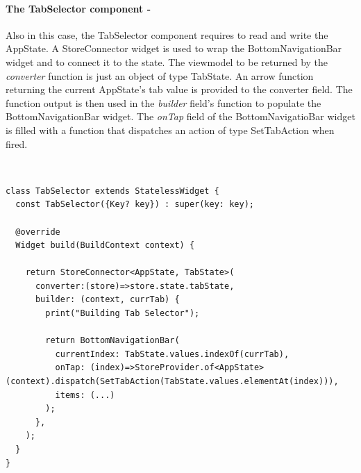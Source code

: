 \paragraph{The TabSelector component - }
\label{subpar:todo_app_bloc_core_state}
Also in this case, the TabSelector component requires to read and write the AppState. A StoreConnector widget is used to wrap the BottomNavigationBar widget and to connect it to the state. The viewmodel to be returned by the \textit{converter} function is just an object of type TabState. An arrow function returning the current AppState’s tab value is provided to the converter field. The function output is then used in the \textit{builder} field's function to populate the BottomNavigationBar widget. The \textit{onTap} field of the BottomNavigatioBar widget is filled with a function that dispatches an action of type SetTabAction when fired.
\begin{code}
\mbox{}\\
 \mbox{}
		\label{code:2.14}
\begin{verbatim}
class TabSelector extends StatelessWidget {
  const TabSelector({Key? key}) : super(key: key);

  @override
  Widget build(BuildContext context) {

    return StoreConnector<AppState, TabState>(
      converter:(store)=>store.state.tabState,
      builder: (context, currTab) {
        print("Building Tab Selector");

        return BottomNavigationBar(
          currentIndex: TabState.values.indexOf(currTab),
          onTap: (index)=>StoreProvider.of<AppState>(context).dispatch(SetTabAction(TabState.values.elementAt(index))),
          items: (...)
        );
      },
    );
  }
}
\end{verbatim}
\mbox{}
\end{code}

